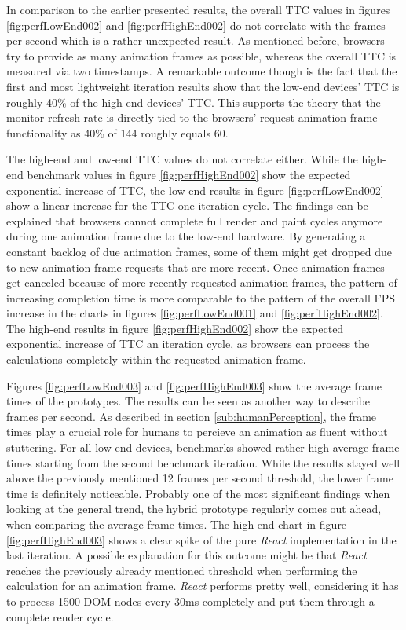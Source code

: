In comparison to the earlier presented results, the overall TTC values in figures \ref{fig:perfLowEnd002} and \ref{fig:perfHighEnd002} do not correlate with the frames per second which is a rather unexpected result. As mentioned before, browsers try to provide as many animation frames as possible, whereas the overall TTC is measured via two timestamps. A remarkable outcome though is the fact that the first and most lightweight iteration results show that the low-end devices' TTC is roughly 40\% of the high-end devices' TTC. This supports the theory that the monitor refresh rate is directly tied to the browsers' request animation frame functionality as 40\% of 144 roughly equals 60. 

The high-end and low-end TTC values do not correlate either. While the high-end benchmark values in figure \ref{fig:perfHighEnd002} show the expected exponential increase of TTC, the low-end results in figure \ref{fig:perfLowEnd002} show a linear increase for the TTC one iteration cycle. The findings can be explained that browsers cannot complete full render and paint cycles anymore during one animation frame due to the low-end hardware. By generating a constant backlog of due animation frames, some of them might get dropped due to new animation frame requests that are more recent. Once animation frames get canceled because of more recently requested animation frames, the pattern of increasing completion time is more comparable to the pattern of the overall FPS increase in the charts in figures \ref{fig:perfLowEnd001} and \ref{fig:perfHighEnd002}. The high-end results in figure \ref{fig:perfHighEnd002} show the expected exponential increase of TTC an iteration cycle, as browsers can process the calculations completely within the requested animation frame.

Figures \ref{fig:perfLowEnd003} and \ref{fig:perfHighEnd003} show the average frame times of the prototypes. The results can be seen as another way to describe frames per second. As described in section \ref{sub:humanPerception}, the frame times play a crucial role for humans to percieve an animation as fluent without stuttering. For all low-end devices, benchmarks showed rather high average frame times starting from the second benchmark iteration. While the results stayed well above the previously mentioned 12 frames per second threshold, the lower frame time is definitely noticeable. Probably one of the most significant findings when looking at the general trend, the hybrid prototype regularly comes out ahead, when comparing the average frame times. The high-end chart in figure \ref{fig:perfHighEnd003} shows a clear spike of the pure \emph{React} implementation in the last iteration. A possible explanation for this outcome might be that \emph{React} reaches the previously already mentioned threshold when performing the calculation for an animation frame. \emph{React} performs pretty well, considering it has to process 1500 DOM nodes every 30ms completely and put them through a complete render cycle.

